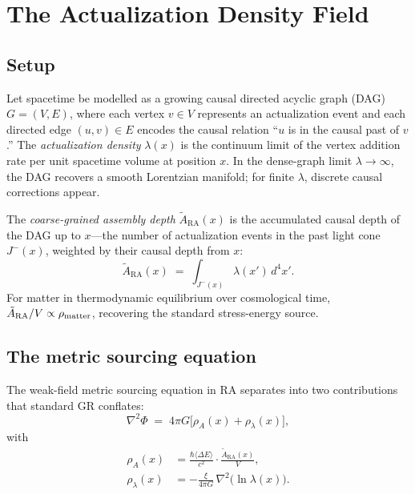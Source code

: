 \documentclass[11pt,twocolumn]{article}
\theoremstyle{plain}
\theoremstyle{remark}
\newcommand{\lambdax}{\lambda(x)}
\newcommand{\ARA}{\tilde{A}_{\mathrm{RA}}}
\begin{document}
\section{The Actualization Density Field}
\label{sec:field}

\subsection{Setup}

Let spacetime be modelled as a growing causal directed acyclic
graph (DAG) $G = (V, E)$, where each vertex $v \in V$ represents
an actualization event and each directed edge $(u,v) \in E$ encodes
the causal relation ``$u$ is in the causal past of $v$.''
The \emph{actualization density} $\lambda(x)$ is the continuum
limit of the vertex addition rate per unit spacetime volume at
position $x$.
In the dense-graph limit $\lambda \to \infty$, the DAG recovers
a smooth Lorentzian manifold; for finite $\lambda$, discrete
causal corrections appear.

The \emph{coarse-grained assembly depth} $\ARA(x)$ is the
accumulated causal depth of the DAG up to $x$---the
number of actualization events in the past light cone
$J^-(x)$, weighted by their causal depth from $x$:
\begin{equation}
  \ARA(x) \;=\; \int_{J^-(x)} \lambda(x')\, d^4x'.
  \label{eq:depth}
\end{equation}
For matter in thermodynamic equilibrium over cosmological time,
$\ARA/V \propto \rho_{\rm matter}$, recovering the standard
stress-energy source.

\subsection{The metric sourcing equation}

The weak-field metric sourcing equation in RA separates into
two contributions that standard GR conflates:
\begin{equation}
  \nabla^2\Phi \;=\; 4\pi G\bigl[\rho_A(x) + \rho_\lambda(x)\bigr],
  \label{eq:sourcing}
\end{equation}
with
\begin{align}
  \rho_A(x) &= \frac{\hbar\langle\Delta E\rangle}{c^2}
               \cdot \frac{\ARA(x)}{V},
  \label{eq:rhoA} \\[4pt]
  \rho_\lambda(x) &= -\frac{\xi}{4\pi G}\,\nabla^2\!\bigl(\ln\lambdax\bigr).
  \label{eq:rhoL}
\end{align}
\end{document}
